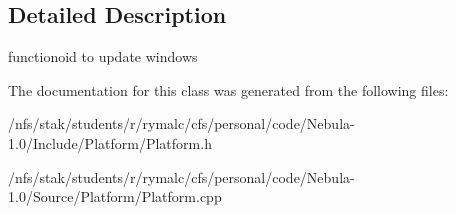 \subsection{Detailed Description}
functionoid to update windows 

The documentation for this class was generated from the following files:\begin{DoxyCompactItemize}
\item 
/nfs/stak/students/r/rymalc/cfs/personal/code/Nebula-\/1.0/Include/Platform/Platform.h\item 
/nfs/stak/students/r/rymalc/cfs/personal/code/Nebula-\/1.0/Source/Platform/Platform.cpp\end{DoxyCompactItemize}

